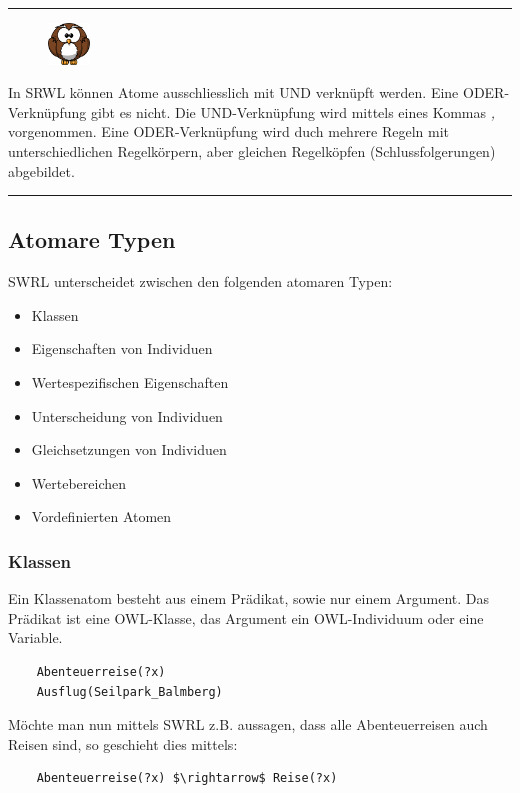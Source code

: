 \noindent\rule[1ex]{\textwidth}{1pt}
\begin{figure}
    \vspace{-12pt}
    \includegraphics[width=0.1\textwidth]{bilder/owl.png}
\end{figure}
In SRWL können Atome ausschliesslich mit UND verknüpft werden. Eine ODER-Verknüpfung gibt es nicht. Die UND-Verknüpfung wird mittels eines Kommas \textit{,} vorgenommen. Eine ODER-Verknüpfung wird duch mehrere Regeln mit unterschiedlichen Regelkörpern, aber gleichen Regelköpfen (Schlussfolgerungen) abgebildet.

\noindent\rule[1ex]{\textwidth}{1pt}

\subsection{Atomare Typen}
\label{subsec:swrl_aufbau_atomaretypen}
SWRL unterscheidet zwischen den folgenden atomaren Typen:
\begin{itemize}
    \item Klassen
    \item Eigenschaften von Individuen
    \item Wertespezifischen Eigenschaften
    \item Unterscheidung von Individuen
    \item Gleichsetzungen von Individuen
    \item Wertebereichen
    \item Vordefinierten Atomen
\end{itemize}

\subsubsection{Klassen}
\label{ssubsec:swrl_aufbau_atomaretypen_klassen}
Ein Klassenatom besteht aus einem Prädikat, sowie nur einem Argument. Das Prädikat ist eine OWL-Klasse, das Argument ein OWL-Individuum oder eine Variable.
\lstset{language=XML}
\begin{lstlisting}
    Abenteuerreise(?x)
    Ausflug(Seilpark_Balmberg)
\end{lstlisting}

Möchte man nun mittels SWRL z.B. aussagen, dass alle Abenteuerreisen auch Reisen sind, so geschieht dies mittels:
\lstset{language=XML}
\begin{lstlisting}
    Abenteuerreise(?x) $\rightarrow$ Reise(?x)
\end{lstlisting}

